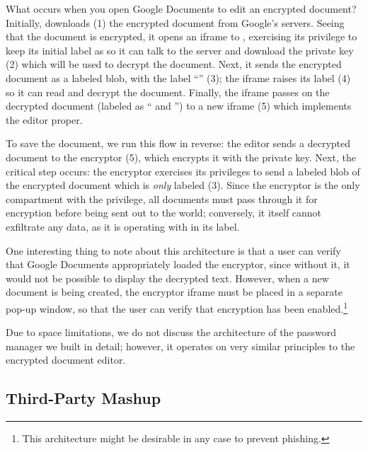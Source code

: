What occurs when you open Google Documents to edit an encrypted
document?
%
Initially,  downloads (1) the encrypted document from
Google's servers.
%
Seeing that the document is encrypted, it opens an iframe to
, exercising its privilege to keep its initial label as
 so it can talk to the  server and
download the private key (2) which will be used to decrypt the document.
%
Next, it sends the encrypted document as a labeled blob, with the label
``'' (3); the iframe raises its label (4) so it can read
and decrypt the document.
%
Finally, the iframe passes on the decrypted document (labeled as
`` and '') to a new iframe (5) which
implements the editor proper.

To save the document, we run this flow in reverse: the editor sends a
decrypted document to the encryptor (5), which encrypts it with the
private key.  Next, the critical step occurs: the encryptor exercises its privileges
to send a labeled blob of the encrypted document which is \emph{only}
labeled  (3).  Since the encryptor is the only compartment
with the  privilege, all documents must pass through it for
encryption before being sent out to the world; conversely, it itself cannot
exfiltrate any data, as it is operating with  in its label.

One interesting thing to note about this architecture is that a user can
verify that Google Documents appropriately loaded the encryptor, since
without it, it would not be possible to display the decrypted text.  However, when
a new document is being created, the encryptor iframe must be placed
in a separate pop-up window, so that the user can verify that encryption
has been enabled.\footnote{This architecture might be desirable in any case
to prevent phishing.}

Due to space limitations, we do not discuss the architecture of the
password manager we built in detail; however, it operates on very
similar principles to the encrypted document editor.

\subsection{Third-Party Mashup}
\label{sec:apps-mashup}

